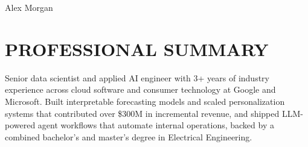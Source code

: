     \begin{header}
        \fontsize{25 pt}{25 pt}\selectfont Alex Morgan

        \vspace{5 pt}

        \normalsize
        \contactsep
        \contactsep
        \contactsep
    \end{header}

    \vspace{-0.12 cm}

    \section{PROFESSIONAL SUMMARY}
    \begin{onecolentry}
        Senior data scientist and applied AI engineer with 3+ years of industry experience across cloud software and consumer technology at Google and Microsoft. Built interpretable forecasting models and scaled personalization systems that contributed over \$300M in incremental revenue, and shipped LLM-powered agent workflows that automate internal operations, backed by a combined bachelor's and master's degree in Electrical Engineering.
    \end{onecolentry}

